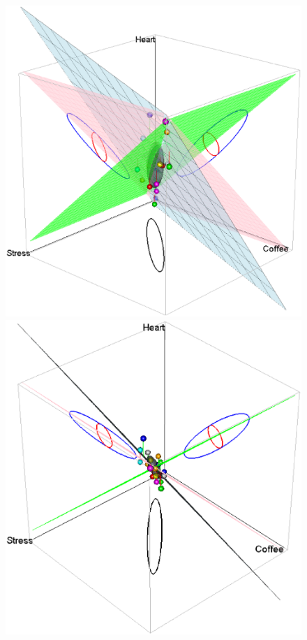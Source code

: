 \begin{figure}[htb]
 \begin{minipage}[b]{.49\linewidth}
  \centering
  \includegraphics[width=1\linewidth]{fig/coffee-av3D-1}
 \end{minipage}%
 \hfill
 \begin{minipage}[b]{.49\linewidth}
  \centering
  \includegraphics[width=1\linewidth]{fig/coffee-av3D-2}

\end{minipage}
\end{figure}
